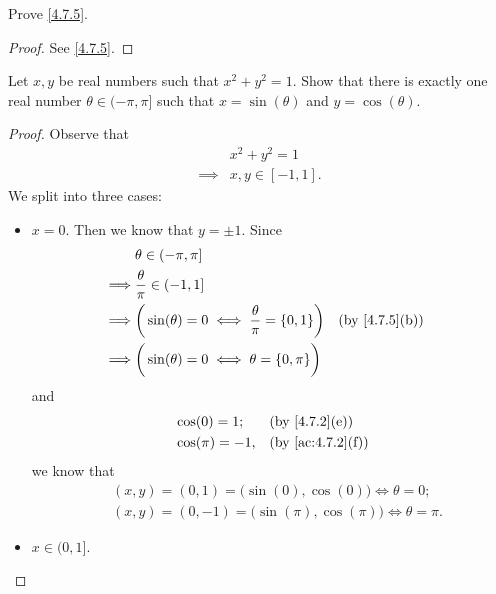 \begin{ex}\label{ex:4.7.3}
  Prove \cref{4.7.5}.
\end{ex}

\begin{proof}
  See \cref{4.7.5}.
\end{proof}

\begin{ex}\label{ex:4.7.4}
  Let \(x, y\) be real numbers such that \(x^2 + y^2 = 1\).
  Show that there is exactly one real number \(\theta \in (-\pi, \pi]\) such that \(x = \sin(\theta)\) and \(y = \cos(\theta)\).
\end{ex}

\begin{proof}
  Observe that
  \begin{align*}
             & x^2 + y^2 = 1     \\
    \implies & x, y \in [-1, 1].
  \end{align*}
  We split into three cases:
  \begin{itemize}
    \item \(x = 0\).
          Then we know that \(y = \pm 1\).
          Since
          \begin{align*}
                     & \theta \in (-\pi, \pi]                                                                              \\
            \implies & \dfrac{\theta}{\pi} \in (-1, 1]                                                                     \\
            \implies & \bigg(\sin(\theta) = 0 \iff \dfrac{\theta}{\pi} = \set{0, 1}\bigg) &  & \text{(by \cref{4.7.5}(b))} \\
            \implies & \bigg(\sin(\theta) = 0 \iff \theta = \set{0, \pi}\bigg)
          \end{align*}
          and
          \begin{align*}
             & \cos(0) = 1;    &  & \text{(by \cref{4.7.2}(e))}    \\
             & \cos(\pi) = -1, &  & \text{(by \cref{ac:4.7.2}(f))}
          \end{align*}
          we know that
          \begin{align*}
             & (x, y) = (0, 1) = \big(\sin(0), \cos(0)\big) \iff \theta = 0;        \\
             & (x, y) = (0, -1) = \big(\sin(\pi), \cos(\pi)\big) \iff \theta = \pi.
          \end{align*}
    \item \(x \in (0, 1]\).

\end{itemize}
\end{proof}
